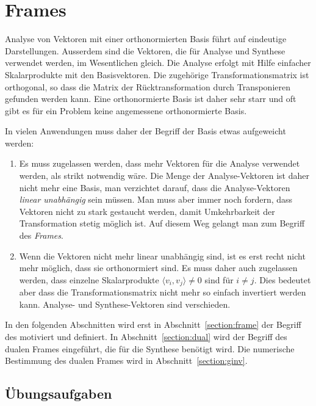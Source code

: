 %
%
%
\chapter{Frames
\label{chapter:frames}}
Analyse von Vektoren mit einer orthonormierten Basis führt auf eindeutige
Darstellungen. 
Ausserdem sind die Vektoren, die für Analyse und Synthese verwendet
werden, im Wesentlichen gleich.
Die Analyse erfolgt mit Hilfe einfacher Skalarprodukte mit den Basisvektoren.
Die zugehörige Transformationsmatrix ist orthogonal, so dass die
Matrix der Rücktransformation durch Transponieren gefunden werden kann.
Eine orthonormierte Basis ist daher sehr starr und oft gibt es für ein
Problem keine angemessene orthonormierte Basis.

In vielen Anwendungen muss daher der Begriff der Basis etwas aufgeweicht
werden:
\begin{enumerate}
\item
Es muss zugelassen werden, dass mehr Vektoren für die Analyse verwendet
werden, als strikt notwendig wäre.
Die Menge der Analyse-Vektoren ist daher nicht mehr eine Basis, man
verzichtet darauf, dass die Analyse-Vektoren {\em linear unabhängig} sein
müssen.
Man muss aber immer noch fordern, dass Vektoren nicht zu stark gestaucht
werden, damit Umkehrbarkeit der Transformation stetig möglich ist.
Auf diesem Weg gelangt man zum Begriff des {\em Frames}.
\item
Wenn die Vektoren nicht mehr linear unabhängig sind, ist es erst
recht nicht mehr möglich, dass sie orthonormiert sind.
Es muss daher auch zugelassen werden, dass einzelne Skalarprodukte 
$\langle v_i,v_j\rangle\ne 0$ sind für $i\ne j$.
Dies bedeutet aber dass die Transformationsmatrix nicht mehr so einfach
invertiert werden kann.
Analyse- und Synthese-Vektoren sind verschieden.
\end{enumerate}
In den folgenden Abschnitten wird erst in Abschnitt~\ref{section:frame}
der Begriff des motiviert und definiert.
In Abschnitt~\ref{section:dual} wird der Begriff des dualen Frames
eingeführt, die für die Synthese benötigt wird.
Die numerische Bestimmung des dualen Frames wird in
Abschnitt~\ref{section:ginv}.






\section*{Übungsaufgaben}






